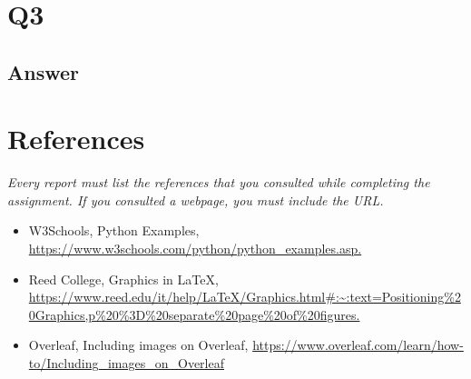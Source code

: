 \documentclass[12pt]{article}
\begin{document}
\section*{Q3}

\subsection*{Answer}

\section*{References}

\emph{Every report must list the references that you consulted while completing the assignment. If you consulted a webpage, you must include the URL.}

\begin{itemize}
    \item {W3Schools, Python Examples, \url{https://www.w3schools.com/python/python_examples.asp.}}
    \item{Reed College, Graphics in LaTeX, \url{https://www.reed.edu/it/help/LaTeX/Graphics.html#:~:text=Positioning%20Graphics,p%20%3D%20separate%20page%20of%20figures.}}
    \item {Overleaf, Including images on Overleaf, 
    \url {https://www.overleaf.com/learn/how-to/Including_images_on_Overleaf}}
\end{itemize}
\end{document}
